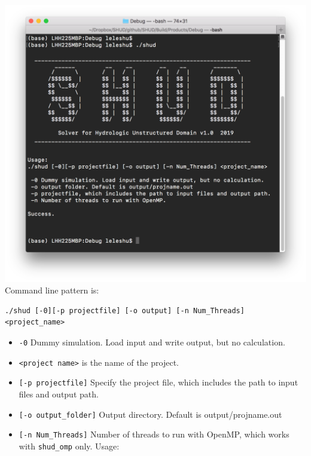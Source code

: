 \documentclass[]{scrbook}
\begin{document}
\includegraphics{Fig/CLI.png} Command line pattern is:

\begin{verbatim}
./shud [-0][-p projectfile] [-o output] [-n Num_Threads] <project_name>
\end{verbatim}

\begin{itemize}
\item
  \texttt{-0} Dummy simulation. Load input and write output, but no
  calculation.
\item
  \texttt{\textless{}project\ name\textgreater{}} is the name of the
  project.
\item
  \texttt{{[}-p\ projectfile{]}} Specify the project file, which
  includes the path to input files and output path.
\item
  \texttt{{[}-o\ output\_folder{]}} Output directory. Default is
  output/projname.out
\item
  \texttt{{[}-n\ Num\_Threads{]}} Number of threads to run with OpenMP,
  which works with \texttt{shud\_omp} only. Usage:
\end{itemize}
\end{document}
